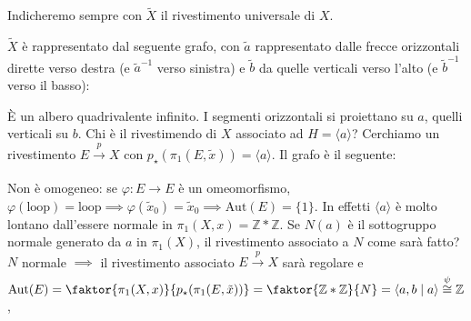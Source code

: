\begin{ex}
  Indicheremo sempre con $\widetilde{X}$ il rivestimento universale di $X$.

  $\widetilde{X}$ è rappresentato dal seguente grafo, con $\tilde{a}$ rappresentato dalle frecce orizzontali dirette verso destra (e $\tilde{a}^{-1}$ verso sinistra) e $\tilde{b}$ da quelle verticali verso l'alto (e $\tilde{b}^{-1}$ verso il basso):
  \begin{center}
  \end{center}
  È un albero quadrivalente infinito. I segmenti orizzontali si proiettano su $a$, quelli verticali su $b$. Chi è il rivestimendo di $X$ associato ad $H=\langle a \rangle$? Cerchiamo un rivestimento $E \xrightarrow[]{p} X$ con $p_{\star}(\pi_1(E, \tilde{x}))=\langle a \rangle$. Il grafo è il seguente:
  \begin{center}
  \end{center}
  Non è omogeneo: se $\varphi:E \rightarrow E$ è un omeomorfismo, $\varphi(\text{loop})=\text{loop} \implies \varphi(\tilde{x}_0)=\tilde{x}_0 \implies \text{Aut}(E)=\{1\}$. In effetti $\langle a \rangle$ è molto lontano dall'essere normale in $\pi_1(X, x)=\mathbb{Z} * \mathbb{Z}$.
  Se $N(a)$ è il sottogruppo normale generato da $a$ in $\pi_1(X)$, il rivestimento associato a $N$ come sarà fatto?
  $N$ normale $\implies$ il rivestimento associato $E \xrightarrow[]{p} X$ sarà regolare e $\text{Aut}(E)=\faktor{\pi_1(X, x)}{p_{\star}(\pi_1(E, \tilde{x}))}=\faktor{\mathbb{Z} * \mathbb{Z}}{N}=\langle a, b \mid a \rangle \overset{\psi}{\cong} \mathbb{Z}$,
  \begin{align*}

\end{align*}
\end{ex}
